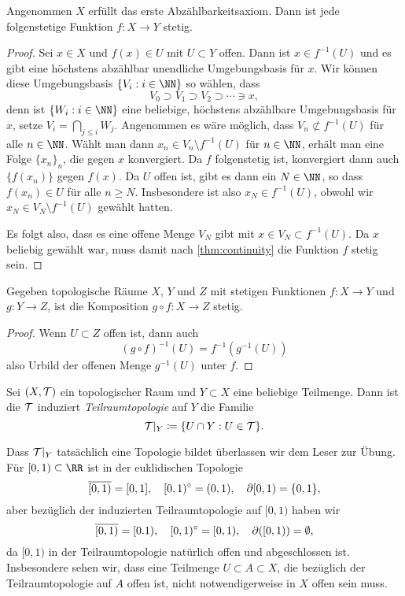 \begin{theorem}
Angenommen $X$ erfüllt das erste Abzählbarkeitsaxiom. Dann ist jede
folgenstetige Funktion $f\colon X\to Y$ stetig.
\end{theorem}
\begin{proof}
Sei $x\in X$ und $f(x)\in U$ mit $U\subset Y$ offen. Dann ist $x\in f^{-1}(U)$
und es gibt eine höchstens abzählbar unendliche Umgebungsbasis für $x$. Wir
können diese Umgebungsbasis $\{V_i : i\in\NN\}$ so wählen, dass
\[
V_0\supset V_1\supset V_2\supset\cdots\ni x,
\]
denn ist $\{W_i : i\in\NN\}$ eine beliebige, höchstens abzählbare Umgebungsbasis
für $x$, setze $V_i = \bigcap_{j\leq i} W_j$. Angenommen es wäre möglich, dass
 $V_n\not\subset f^{-1}(U)$ für alle $n\in\NN$. Wählt man dann $x_n\in
V_n\setminus f^{-1}(U)$ für $n\in\NN$, erhält man eine Folge $\{x_n\}_n$, die
gegen $x$ konvergiert. Da $f$ folgenstetig ist, konvergiert dann auch
$\{f(x_n)\}$ gegen $f(x)$. Da $U$ offen ist, gibt es dann ein $N\in\NN$,
so dass $f(x_n)\in U$ für alle $n\geq N$. Insbesondere ist also $x_N\in
f^{-1}(U)$, obwohl wir $x_N\in V_N\setminus f^{-1}(U)$ gewählt hatten.

Es folgt also, dass es eine offene Menge $V_N$ gibt mit $x\in V_N\subset
f^{-1}(U)$. Da $x$ beliebig gewählt war, muss damit nach \autoref{thm:continuity}
die Funktion $f$ stetig sein.
\end{proof}

\begin{theorem}
Gegeben topologische Räume $X$, $Y$ und $Z$ mit stetigen Funktionen $f\colon
X\to Y$ und $g\colon Y\to Z$, ist die Komposition $g\circ f\colon X\to Z$
stetig.
\end{theorem}
\begin{proof}
Wenn $U\subset Z$ offen ist, dann auch
\[
(g\circ f)^{-1}(U) = f^{-1}(g^{-1}(U))
\]
also Urbild der offenen Menge $g^{-1}(U)$ unter $f$.
\end{proof}
\begin{definition}
Sei $(X,\cal T)$ ein topologischer Raum und $Y\subset X$ eine beliebige
Teilmenge. Dann ist die $\cal T$ induziert \emph{Teilraumtopologie} auf $Y$ die
Familie
\[
\cal T|_Y \coloneqq \{U\cap Y : U\in\cal T\}.
\]
\end{definition}
Dass $\cal T|_Y$ tatsächlich eine Topologie bildet überlassen wir dem Leser zur
Übung. Für $[0,1)\subset\RR$ ist in der euklidischen Topologie
\[
\cl{[0,1)} = [0,1],\quad \Int{[0,1)} = (0,1),\quad \Bdry{[0,1)} = \{0,1\},
\]
aber bezüglich der induzierten Teilraumtopologie auf $[0,1)$ haben wir
\[
\cl{[0,1)} = [0.1),\quad \Int{[0,1)} = [0,1),\quad \Bdry([0,1)) = \emptyset,
\]
da $[0,1)$ in der Teilraumtopologie natürlich offen und abgeschlossen ist.
Insbesondere sehen wir, dass eine Teilmenge $U\subset A\subset X$, die bezüglich
der Teilraumtopologie auf $A$ offen ist, nicht notwendigerweise in $X$ offen
sein muss.


